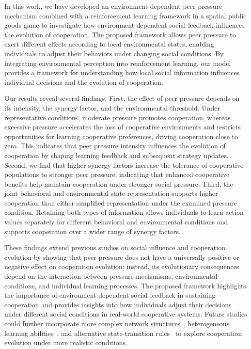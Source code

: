\documentclass[%
  aip,
  amsmath,amssymb,
  reprint,
  showkeys,
]{revtex4-1}
\begin{document}
In this work, we have developed an environment-dependent peer pressure mechanism combined with a reinforcement learning framework in a spatial public goods game to investigate how environment-dependent social feedback influences the evolution of cooperation. 
The proposed framework allows peer pressure to exert different effects according to local environmental states, enabling individuals to adjust their behaviors under changing social conditions. 
By integrating environmental perception into reinforcement learning, our model provides a framework for understanding how local social information influences individual decisions and the evolution of cooperation.

Our results reveal several findings. 
First, the effect of peer pressure depends on its intensity, the synergy factor, and the environmental threshold. 
Under representative conditions, moderate pressure promotes cooperation, whereas excessive pressure accelerates the loss of cooperative environments and restricts opportunities for learning cooperative preferences, driving cooperation close to zero. 
This indicates that peer pressure intensity influences the evolution of cooperation by shaping learning feedback and subsequent strategy updates. 
Second, we find that higher synergy factors increase the tolerance of cooperative populations to stronger peer pressure, indicating that enhanced cooperative benefits help maintain cooperation under stronger social pressure. 
Third, the joint behavioral and environmental state representation supports higher cooperation than either simplified representation under the examined pressure condition. 
Retaining both types of information allows individuals to learn action values separately for different behavioral and environmental conditions and supports cooperation over a wider range of synergy factors.

These findings extend previous studies on social influence and cooperation evolution by showing that peer pressure does not have a universally positive or negative effect on cooperation evolution; instead, its evolutionary consequences depend on the interaction between pressure mechanisms, environmental conditions, and individual learning processes. 
The proposed framework highlights the importance of environment-dependent social feedback in sustaining cooperation and provides insights into how individuals adjust their decisions under different social conditions in real-world cooperative systems. 
Future studies could further incorporate more complex network structures~\cite{shi2024model}, heterogeneous learning abilities~\cite{lee2025granular}, and alternative state-transition rules~\cite{guo2022effect} to explore cooperation evolution under more realistic conditions.
\end{document}
